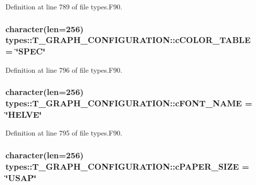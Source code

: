 Definition at line 789 of file types.F90.

\hypertarget{typetypes_1_1_t___g_r_a_p_h___c_o_n_f_i_g_u_r_a_t_i_o_n_a64a7d703e42c4516b1bfc55f7b08d732}{
\subsubsection[{cCOLOR\_\-TABLE}]{\setlength{\rightskip}{0pt plus 5cm}character(len=256) {\bf types::T\_\-GRAPH\_\-CONFIGURATION::cCOLOR\_\-TABLE} = \char`\"{}SPEC\char`\"{}}}
\label{typetypes_1_1_t___g_r_a_p_h___c_o_n_f_i_g_u_r_a_t_i_o_n_a64a7d703e42c4516b1bfc55f7b08d732}


Definition at line 796 of file types.F90.

\hypertarget{typetypes_1_1_t___g_r_a_p_h___c_o_n_f_i_g_u_r_a_t_i_o_n_ae6e8d937b37f328389b96b8cb6dfb9b7}{
\subsubsection[{cFONT\_\-NAME}]{\setlength{\rightskip}{0pt plus 5cm}character(len=256) {\bf types::T\_\-GRAPH\_\-CONFIGURATION::cFONT\_\-NAME} = \char`\"{}HELVE\char`\"{}}}
\label{typetypes_1_1_t___g_r_a_p_h___c_o_n_f_i_g_u_r_a_t_i_o_n_ae6e8d937b37f328389b96b8cb6dfb9b7}


Definition at line 795 of file types.F90.

\hypertarget{typetypes_1_1_t___g_r_a_p_h___c_o_n_f_i_g_u_r_a_t_i_o_n_a3d41b7ebd7081d5fa10c19209d56f739}{
\subsubsection[{cPAPER\_\-SIZE}]{\setlength{\rightskip}{0pt plus 5cm}character(len=256) {\bf types::T\_\-GRAPH\_\-CONFIGURATION::cPAPER\_\-SIZE} = \char`\"{}USAP\char`\"{}}}
\label{typetypes_1_1_t___g_r_a_p_h___c_o_n_f_i_g_u_r_a_t_i_o_n_a3d41b7ebd7081d5fa10c19209d56f739}


